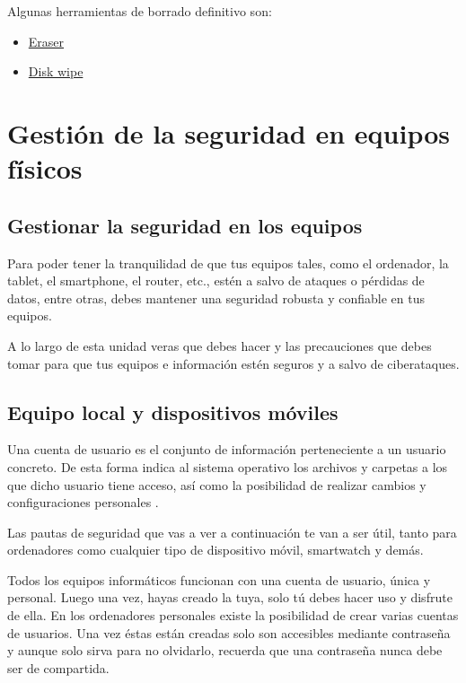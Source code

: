 \documentclass[
  spanish,
  a4paper,
  openany]{book}
\begin{document}
Algunas herramientas de borrado definitivo son:

\begin{itemize}
\item
  \href{https://eraser.heidi.ie/}{Eraser}
\item
  \href{https://www.diskwipe.org/download.php}{Disk wipe}
\end{itemize}

\hypertarget{gestiuxf3n-de-la-seguridad-en-equipos-fuxedsicos}{%
\chapter{Gestión de la seguridad en equipos físicos}\label{gestiuxf3n-de-la-seguridad-en-equipos-fuxedsicos}}

\hypertarget{gestionar-la-seguridad-en-los-equipos}{%
\section{Gestionar la seguridad en los equipos}\label{gestionar-la-seguridad-en-los-equipos}}

Para poder tener la tranquilidad de que tus equipos tales, como el ordenador, la tablet, el smartphone, el router, etc., estén a salvo de ataques o pérdidas de datos, entre otras, debes mantener una seguridad robusta y confiable en tus equipos.

A lo largo de esta unidad veras que debes hacer y las precauciones que debes tomar para que tus equipos e información estén seguros y a salvo de ciberataques.

\hypertarget{equipo-local-y-dispositivos-muxf3viles}{%
\section{Equipo local y dispositivos móviles}\label{equipo-local-y-dispositivos-muxf3viles}}

Una cuenta de usuario es el conjunto de información perteneciente a un usuario concreto. De esta forma indica al sistema operativo los archivos y carpetas a los que dicho usuario tiene acceso, así como la posibilidad de realizar cambios y configuraciones personales \citep{OSI-cuentas}.

Las pautas de seguridad que vas a ver a continuación te van a ser útil, tanto para ordenadores como cualquier tipo de dispositivo móvil, smartwatch y demás.

Todos los equipos informáticos funcionan con una cuenta de usuario, única y personal. Luego una vez, hayas creado la tuya, solo tú debes hacer uso y disfrute de ella. En los ordenadores personales existe la posibilidad de crear varias cuentas de usuarios. Una vez éstas están creadas solo son accesibles mediante contraseña y aunque solo sirva para no olvidarlo, recuerda que una contraseña nunca debe ser de compartida.
\end{document}
